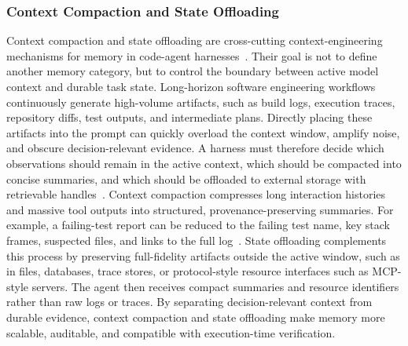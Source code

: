 \subsubsection{Context Compaction and State Offloading}
Context compaction and state offloading are cross-cutting context-engineering mechanisms for memory in code-agent harnesses~\cite{liu2026dive}. Their goal is not to define another memory category, but to control the boundary between active model context and durable task state. Long-horizon software engineering workflows continuously generate high-volume artifacts, such as build logs, execution traces, repository diffs, test outputs, and intermediate plans. Directly placing these artifacts into the prompt can quickly overload the context window, amplify noise, and obscure decision-relevant evidence. A harness must therefore decide which observations should remain in the active context, which should be compacted into concise summaries, and which should be offloaded to external storage with retrievable handles~\cite{zhou2026externalization}.
Context compaction compresses long interaction histories and massive tool outputs into structured, provenance-preserving summaries. For example, a failing-test report can be reduced to the failing test name, key stack frames, suspected files, and links to the full log~\cite{jia2026compressing,sun2025scaling,shi2025longcodezip,wang2026swe}. State offloading complements this process by preserving full-fidelity artifacts outside the active window, such as in files, databases, trace stores, or protocol-style resource interfaces such as MCP-style servers. The agent then receives compact summaries and resource identifiers rather than raw logs or traces. By separating decision-relevant context from durable evidence, context compaction and state offloading make memory more scalable, auditable, and compatible with execution-time verification.



